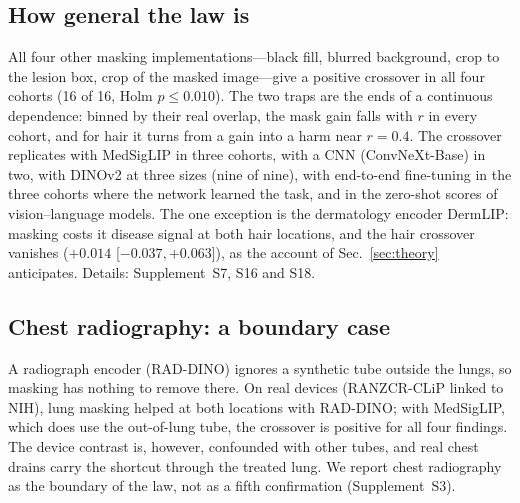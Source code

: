 \subsection{How general the law is}\label{sec:impl}\label{sec:replication}
All four other masking implementations---black fill, blurred background, crop to the lesion box, crop of the masked
image---give a positive crossover in all four cohorts (16 of 16, Holm $p\le0.010$). The two traps are the ends of a
continuous dependence: binned by their real overlap, the mask gain falls with $r$ in every cohort, and for hair it turns
from a gain into a harm near $r=0.4$. The
crossover replicates with MedSigLIP in three cohorts, with a CNN (ConvNeXt-Base) in two, with DINOv2 at three sizes
(nine of nine), with end-to-end fine-tuning in the three cohorts where the network learned the task, and in the
zero-shot scores of vision--language models. The one exception is the dermatology encoder DermLIP: masking costs it
disease signal at both hair locations, and the hair crossover vanishes ($+0.014$ [$-0.037, +0.063$]), as the account of
Sec.~\ref{sec:theory} anticipates. Details: Supplement~S7, S16 and S18.

\subsection{Chest radiography: a boundary case}
A radiograph encoder (RAD-DINO) ignores a synthetic tube outside the lungs, so masking has nothing to remove there. On
real devices (RANZCR-CLiP linked to NIH), lung masking helped at both locations with RAD-DINO; with MedSigLIP, which does
use the out-of-lung tube, the crossover is positive for all four findings. The device contrast is, however, confounded
with other tubes, and real chest drains carry the shortcut through the treated lung. We report
chest radiography as the boundary of the law, not as a fifth confirmation (Supplement~S3).
